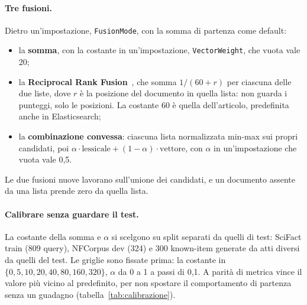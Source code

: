 \paragraph{Tre fusioni.} Dietro un'impostazione, \texttt{FusionMode}, con la somma
di partenza come default:
\begin{itemize}
  \item la \textbf{somma}, con la costante in un'impostazione, \texttt{VectorWeight},
        che vuota vale 20;
  \item la \textbf{Reciprocal Rank Fusion}~\cite{cormack2009rrf}, che somma
        $1/(60 + r)$ per ciascuna delle due liste, dove $r$ è la posizione del
        documento in quella lista: non guarda i punteggi, solo le posizioni. La
        costante 60 è quella dell'articolo, predefinita anche in Elasticsearch;
  \item la \textbf{combinazione convessa}: ciascuna lista normalizzata min-max sui
        propri candidati, poi $\alpha \cdot \text{lessicale} + (1-\alpha) \cdot
        \text{vettore}$, con $\alpha$ in un'impostazione che vuota vale 0,5.
\end{itemize}
Le due fusioni nuove lavorano sull'unione dei candidati, e un documento assente da
una lista prende zero da quella lista.

\paragraph{Calibrare senza guardare il test.} La costante della somma e $\alpha$
si scelgono su split separati da quelli di test: SciFact train (809 query), NFCorpus
dev (324) e 300 known-item generate da atti diversi da quelli del test. Le griglie
sono fissate prima: la costante in $\{0, 5, 10, 20, 40, 80, 160, 320\}$, $\alpha$ da
0 a 1 a passi di 0,1. A parità di metrica vince il valore più vicino al predefinito,
per non spostare il comportamento di partenza senza un guadagno
(tabella~\ref{tab:calibrazione}).

